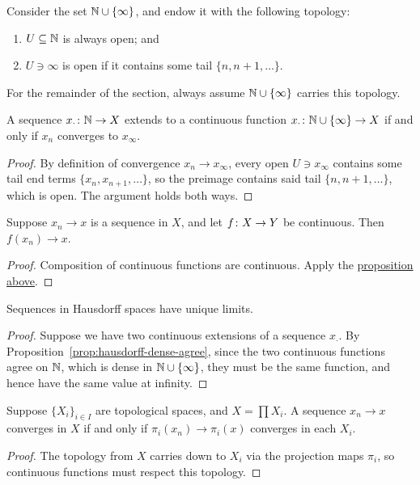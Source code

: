 \begin{definition}
    Consider the set \(\mathbb{N} \cup \{\infty\}\),
    and endow it with the following topology:
    \begin{enumerate}[label=(\roman*), itemsep=0mm]
        \item \(U \subseteq \mathbb{N}\) is always open; and
        \item \(U \ni \infty\) is open if it contains some tail \(\{n,n+1,\hdots\}\).
    \end{enumerate}
\end{definition}
\begin{remark}
    For the remainder of the section, always assume \(\mathbb{N} \cup \{\infty\}\) carries this topology.
\end{remark}
\begin{proposition}\label{prop:convergence-extend-continuity}
    A sequence \(x_\cdot\colon\mathbb{N}\to X\) extends to a continuous function \(x_\cdot\colon\mathbb{N}\cup\{\infty\}\to X\)
    if and only if \(x_n\) converges to \(x_\infty\).
\end{proposition}
\begin{proof}
    By definition of convergence \(x_n \to x_\infty\),
    every open \(U \ni x_\infty\) contains some tail end terms \(\{x_n,x_{n+1},\hdots\}\),
    so the preimage contains said tail \(\{n,n+1,\hdots\}\), which is open.
    The argument holds both ways.
\end{proof}
\begin{corollary}
    Suppose \(x_n \to x\) is a sequence in \(X\), and let \(f\colon X\to Y\) be continuous.
    Then \(f(x_n) \to x\).
\end{corollary}
\begin{proof}
    Composition of continuous functions are continuous.
    Apply the \hyperref[prop:convergence-extend-continuity]{proposition above}.
\end{proof}

\begin{proposition}
    Sequences in Hausdorff spaces have unique limits.
\end{proposition}
\begin{proof}
    Suppose we have two continuous extensions of a sequence \(x_\cdot\).
    By Proposition~\ref{prop:hausdorff-dense-agree},
    since the two continuous functions agree on \(\mathbb{N}\), which is dense in \(\mathbb{N}\cup\{\infty\}\),
    they must be the same function, and hence have the same value at infinity.
\end{proof}
\begin{proposition}
    Suppose \({\{X_i\}}_{i \in I}\) are topological spaces, and \(X = \prod X_i\).
    A sequence \(x_n \to x\) converges in \(X\)
    if and only if \(\pi_i(x_n) \to \pi_i(x)\) converges in each \(X_i\).
\end{proposition}
\begin{proof}
    The topology from \(X\) carries down to \(X_i\) via the projection maps \(\pi_i\),
    so continuous functions must respect this topology.
\end{proof}


